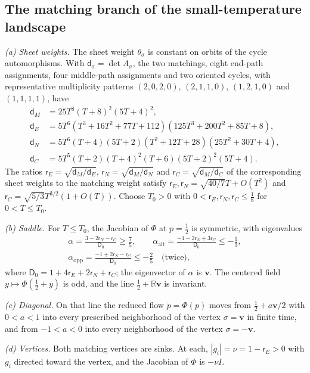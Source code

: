 \subsection{The matching branch of the small-temperature landscape}\label{app:sel_landscape}

\begin{lemma}[Landscape]\label{lem:sel_landscape}
\emph{(a) Sheet weights.} The sheet weight $\theta_\sigma$ is constant on orbits of the cycle automorphisms. With $\mathsf d_\sigma=\det A_\sigma$, the two matchings, eight end-path assignments, four middle-path assignments and two oriented cycles, with representative multiplicity patterns $(2,0,2,0)$, $(2,1,1,0)$, $(1,2,1,0)$ and $(1,1,1,1)$, have
\[
\begin{aligned}
\mathsf d_M&=25T^8(T+8)^2(5T+4)^2,\\
\mathsf d_E&=5T^6(T^3+16T^2+77T+112)(125T^3+200T^2+85T+8),\\
\mathsf d_N&=5T^6(T+4)(5T+2)(T^2+12T+28)(25T^2+30T+4),\\
\mathsf d_C&=5T^5(T+2)(T+4)^2(T+6)(5T+2)^2(5T+4).
\end{aligned}
\]
The ratios $\mathsf r_E=\sqrt{\mathsf d_M/\mathsf d_E}$, $\mathsf r_N=\sqrt{\mathsf d_M/\mathsf d_N}$ and $\mathsf r_C=\sqrt{\mathsf d_M/\mathsf d_C}$ of the corresponding sheet weights to the matching weight satisfy $\mathsf r_E,\mathsf r_N=\sqrt{40/7}T+O(T^2)$ and $\mathsf r_C=\sqrt{5/3}T^{3/2}(1+O(T))$. Choose $T_0>0$ with $0<\mathsf r_E,\mathsf r_N,\mathsf r_C\le\frac18$ for $0<T\le T_0$.

\emph{(b) Saddle.} For $T\le T_0$, the Jacobian of $\Phi$ at $p=\frac12$ is symmetric, with eigenvalues
\begin{equation}
\begin{gathered}
\alpha=\frac{3-2\mathsf r_N-\mathsf r_C}{\mathsf D_0}\ge\frac75,\qquad
\alpha_{\mathrm{alt}}=\frac{-1-2\mathsf r_N+3\mathsf r_C}{\mathsf D_0}\le-\frac13,\\
\alpha_{\mathrm{opp}}=\frac{-1+2\mathsf r_N-\mathsf r_C}{\mathsf D_0}\le-\frac25\quad\text{(twice)},
\end{gathered}
\label{eq:sel_saddle_spectrum}
\end{equation}
where $\mathsf D_0=1+4\mathsf r_E+2\mathsf r_N+\mathsf r_C$; the eigenvector of $\alpha$ is $\mathbf v$. The centered field $y\mapsto\Phi(\frac12+y)$ is odd, and the line $\frac12+\mathbb R\mathbf v$ is invariant.

\emph{(c) Diagonal.} On that line the reduced flow $\dot p=\Phi(p)$ moves from $\frac12+a\mathbf v/2$ with $0<a<1$ into every prescribed neighborhood of the vertex $\sigma=\mathbf v$ in finite time, and from $-1<a<0$ into every neighborhood of the vertex $\sigma=-\mathbf v$.

\emph{(d) Vertices.} Both matching vertices are sinks. At each, $|g_i|=\nu=1-\mathsf r_E>0$ with $g_i$ directed toward the vertex, and the Jacobian of $\Phi$ is $-\nu I$.
\end{lemma}

